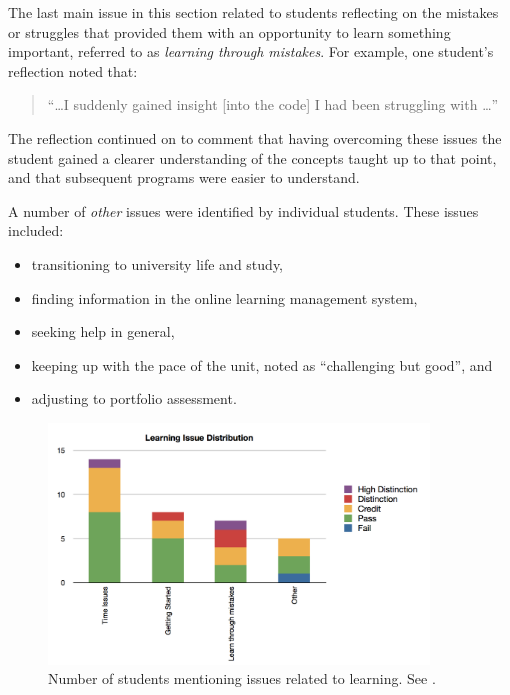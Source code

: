 
The last main issue in this section related to students reflecting on the mistakes or struggles that provided them with an opportunity to learn something important, referred to as \emph{learning through mistakes}. For example, one student's reflection noted that:

\begin{quote}
``\ldots I suddenly gained insight [into the code] I had been struggling with \ldots''
\end{quote}

\noindent The reflection continued on to comment that having overcoming these issues the student gained a clearer understanding of the concepts taught up to that point, and that subsequent programs were easier to understand. 

A number of \emph{other} issues were identified by individual students. These issues included: 
\begin{itemize}[noitemsep,nolistsep]
	\item transitioning to university life and study,
	\item finding information in the online learning management system,
	\item seeking help in general,
	\item keeping up with the pace of the unit, noted as ``challenging but good'', and
	\item adjusting to portfolio assessment.
\end{itemize}


\begin{figure}[htbp]
	\centering
	\includegraphics[width=0.9\textwidth]{LearningIssues}
	\caption{Number of students mentioning issues related to learning. See .}
	\label{fig:learning_issues}
\end{figure}


